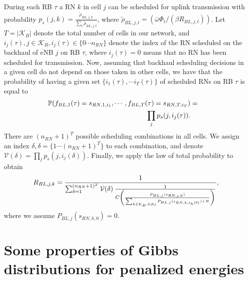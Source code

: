 \documentclass[draftcls,onecolumn]{IEEEtran}
\theoremstyle{plain}
\theoremstyle{definition}
\begin{document}
During each RB $\tau$ a RN $k$ in cell $j$ can be scheduled for uplink transmission with probability 
$ p_s(j,k)= \frac{\tilde{\rho}_{BL,j,k}}{\sum_t \tilde{\rho}_{BL,j,t}}$,
where $\tilde{\rho}_{BL,j,t}=(\bar{\omega}\Phi_t/(\beta R_{BL,j,t}))$.
Let $T=|\mathcal{K}_{B}|$ denote the total number of cells in our network, and $i_j(\tau), j\in \mathcal{K}_{B}, i_j(\tau)\in \{0 \cdots n_{RN}\}$ denote the index of the RN scheduled on the backhaul of eNB $j$ on RB $\tau$, where $i_j(\tau)=0$ means that no RN has been scheduled for transmission. 
Now, assuming that backhaul scheduling decisions in a given cell do not depend on those taken in other cells, we have that the probability of having a given set $\{i_1(\tau), \cdots i_T(\tau) \}$ of scheduled RNs on RB $\tau$ is equal to 
\begin{eqnarray}
\mathbb{P}(f_{BL,1}(\tau)=s_{RN,1,i_1}, \cdots , f_{BL,T}(\tau)=s_{RN,T,i_T})&=&\notag \\
\prod_{j} p_s(j,i_j(\tau)). &&
\end{eqnarray}
There are $(n_{RN}+1)^{T}$ possible scheduling combinations in all cells. We assign an index $\delta, \delta=\{1\cdots (n_{RN}+1)^{T}\}$ to each combination, and denote $\mathcal{V}(\delta)=\prod_{j} p_s(j,i_j(\delta))$. 
Finally, we apply the law of total probability to obtain
\begin{equation}
   R_{BL,j,k}=\displaystyle \frac{1}{\sum_{\delta=1}^{(n_{RN}+1)^{T}}\mathcal{V}(\delta) \hspace{2 pt}
                        \frac{1}{C\left(\frac{P_{BL,j}(s_{RN,j,k})}{  \sum_{h\in \mathcal{K}_B,h\neq j} P_{BL,j}(s_{RN,h,i_h(\delta)}) +N }\right)}},
\end{equation}
where we assume $P_{BL,j}(s_{RN,h,0})=0$.




\section{Some properties of Gibbs distributions for penalized energies} \label{app:gibbs}
\end{document}
